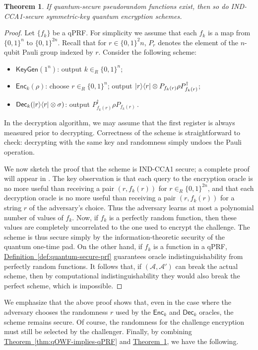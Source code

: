 \documentclass[11pt]{article}
\numberwithin{equation}{section}
\newtheorem{theorem}{Theorem}
\newcommand{\expref}[2]{\texorpdfstring{\hyperref[#2]{#1~\ref{#2}}}{#1~\ref{#2}}}
\newcommand{\algo}{\mathcal}
\newcommand{\KeyGen}{\ensuremath{\mathsf{KeyGen}}\xspace}
\newcommand{\Enc}{\ensuremath{\mathsf{Enc}}\xspace}
\newcommand{\Dec}{\ensuremath{\mathsf{Dec}}\xspace}
\newcommand{\inrand}{\in_R}
\begin{document}
{\begin{theorem}\label{thm:IND-CCA1}
If quantum-secure pseudorandom functions exist, then so do IND-CCA1-secure symmetric-key quantum encryption schemes.
\end{theorem}
\begin{proof}
Let $\{f_k\}$ be a qPRF. For simplicity we assume that each $f_k$ is a map from $\{0, 1\}^n$ to $\{0, 1\}^{2n}$. Recall that for $r \in \{0, 1\}^2n$, $P_r$ denotes the element of the $n$-qubit Pauli group indexed by $r$. Consider the following scheme:
\begin{itemize}
\item $\KeyGen(1^n)$: output $k \inrand \{0, 1\}^n$;
\item $\Enc_k(\rho)$: choose $r \inrand \{0, 1\}^n$; output ${\left\vert{r}\right\rangle}{\left\langle{r}\right\vert} \otimes P_{f_k(r)} \rho P_{f_k(r)}^{\dagger}$;
\item $\Dec_k(\ket{r}\bra{r} \otimes \sigma)$: output  $P_{f_k(r)}^\dagger \rho P_{f_k(r)}$\,.
\end{itemize}
In the decryption algorithm, we may assume that the first register is always measured prior to decrypting. Correctness of the scheme is straightforward to check: decrypting with the same key and randomness simply undoes the Pauli operation.

We now sketch the proof that the scheme is IND-CCA1 secure; a complete proof will appear in \cite{ABFGSS15}. The key observation is that each query to the encryption oracle is no more useful than receiving a pair $(r, f_k(r))$ for $r \inrand \{0, 1\}^{2n}$, and that each decryption oracle is no more useful than receiving a pair $(r, f_k(r))$ for a string $r$ of the adversary's choice. Thus the adversary learns at most a polynomial number of values of $f_k$. Now, if $f_k$ is a perfectly random function, then these values are completely uncorrelated to the one used to encrypt the challenge. The scheme is thus secure simply by the information-theoretic security of the quantum one-time pad. On the other hand, if $f_k$ is a function in a qPRF, \expref{Definition}{def:quantum-secure-prf} guarantees oracle indistinguishability from perfectly random functions. It follows that, if $(\algo A, \algo A')$ can break the actual scheme, then by computational indistinguishability they would also break the perfect scheme, which is impossible.
\end{proof}

We emphasize that the above proof shows that, even in the case where the adversary chooses the randomness $r$ used by the $\Enc_k$ and $\Dec_k$ oracles, the scheme remains secure. Of course, the randomness for the challenge encryption must still be selected by the challenger. Finally, by combining \expref{Theorem}{thm:qOWF-implies-qPRF} and \expref{Theorem}{thm:IND-CCA1}, we have the following.

}
\end{document}
